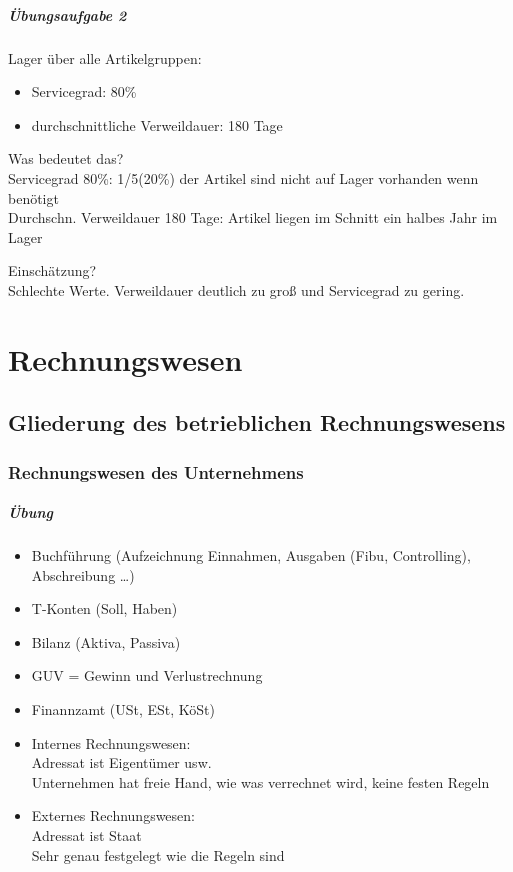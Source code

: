 \documentclass{scrreprt}
\begin{document}
\paragraph{Übungsaufgabe 2} Lager über alle Artikelgruppen:
\begin{itemize}
\item Servicegrad: 80\%
\item durchschnittliche Verweildauer: 180 Tage
\end{itemize}
\begin{anumerate}
\item Was bedeutet das?\\
Servicegrad 80\%: 1/5(20\%) der Artikel sind nicht auf Lager vorhanden wenn benötigt\\
Durchschn. Verweildauer 180 Tage: Artikel liegen im Schnitt ein halbes Jahr im Lager
\item Einschätzung?\\
Schlechte Werte. Verweildauer deutlich zu groß und Servicegrad zu gering.
\end{anumerate}

\chapter{Rechnungswesen}
\section{Gliederung des betrieblichen Rechnungswesens}
\subsection{Rechnungswesen des Unternehmens}
\paragraph{Übung}
\begin{itemize}
\item Buchführung (Aufzeichnung Einnahmen, Ausgaben (Fibu, Controlling), Abschreibung …)
\item T-Konten (Soll, Haben)
\item Bilanz (Aktiva, Passiva)
\item GUV = Gewinn und Verlustrechnung
\item Finannzamt (USt, ESt, KöSt)
\end{itemize}
\begin{itemize}
\item Internes Rechnungswesen: \\
Adressat ist Eigentümer usw.\\
Unternehmen hat freie Hand, wie was verrechnet wird, keine festen Regeln
\item Externes Rechnungswesen: \\
Adressat ist Staat\\
Sehr genau festgelegt wie die Regeln sind 
\end{itemize}
\end{document}

